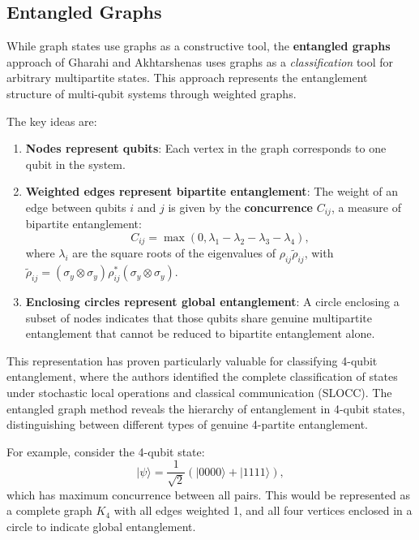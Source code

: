 \documentclass[12pt,a4paper]{article}
\begin{document}
\subsection{Entangled Graphs}
\label{sec:entangled-graphs}

While graph states use graphs as a constructive tool, the \textbf{entangled graphs} approach of Gharahi and Akhtarshenas \cite{EntangledGraphs} uses graphs as a \emph{classification} tool for arbitrary multipartite states. This approach represents the entanglement structure of multi-qubit systems through weighted graphs.

The key ideas are:
\begin{enumerate}
	\item \textbf{Nodes represent qubits}: Each vertex in the graph corresponds to one qubit in the system.
	\item \textbf{Weighted edges represent bipartite entanglement}: The weight of an edge between qubits $i$ and $j$ is given by the \textbf{concurrence} $C_{ij}$, a measure of bipartite entanglement:
	      \begin{equation}
		      C_{ij} = \max(0, \lambda_1 - \lambda_2 - \lambda_3 - \lambda_4),
	      \end{equation}
	      where $\lambda_i$ are the square roots of the eigenvalues of $\rho_{ij}\tilde{\rho}_{ij}$, with $\tilde{\rho}_{ij} = (\sigma_y \otimes \sigma_y) \rho_{ij}^* (\sigma_y \otimes \sigma_y)$.
	\item \textbf{Enclosing circles represent global entanglement}: A circle enclosing a subset of nodes indicates that those qubits share genuine multipartite entanglement that cannot be reduced to bipartite entanglement alone.
\end{enumerate}

This representation has proven particularly valuable for classifying 4-qubit entanglement, where the authors identified the complete classification of states under stochastic local operations and classical communication (SLOCC). The entangled graph method reveals the hierarchy of entanglement in 4-qubit states, distinguishing between different types of genuine 4-partite entanglement.

For example, consider the 4-qubit state:
\begin{equation}
	|\psi\rangle = \frac{1}{\sqrt{2}}(|0000\rangle + |1111\rangle),
\end{equation}
which has maximum concurrence between all pairs. This would be represented as a complete graph $K_4$ with all edges weighted 1, and all four vertices enclosed in a circle to indicate global entanglement.
\end{document}
